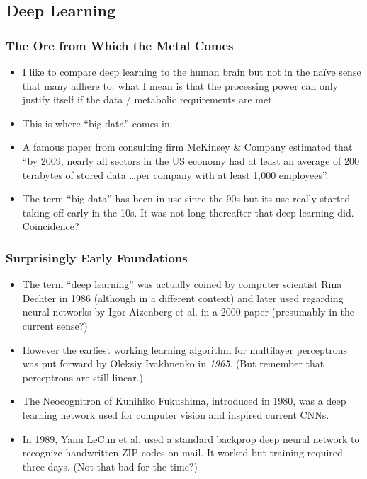\documentclass[10pt]{beamer}
\begin{document}

  \subsection{Deep Learning}

  \begin{frame}
    \frametitle{The Ore from Which the Metal Comes}

    \begin{itemize}
      \item I like to compare deep learning to the human brain but not in the
        naïve sense that many adhere to: what I mean is that the processing
        power can only justify itself if the data / metabolic requirements are
        met.
      \pause
      \item This is where ``big data'' comes in.
      \pause
      \item A famous paper from consulting firm McKinsey \& Company estimated
        that ``by 2009, nearly all sectors in the US economy had at least an
        average of 200 terabytes of stored data \ldots per company with at
        least 1,000 employees''.
      \pause
      \item The term ``big data'' has been in use since the 90s but its use
        really started taking off early in the 10s. It was not long thereafter
        that deep learning did. Coincidence?
    \end{itemize}
  \end{frame}

  \begin{frame}
    \frametitle{Surprisingly Early Foundations}

    \begin{itemize}
      \item The term ``deep learning'' was actually coined by computer
        scientist Rina Dechter in 1986 (although in a different context) and
        later used regarding neural networks by Igor Aizenberg et al. in a
        2000 paper (presumably in the current sense?)
      \pause
      \item However the earliest working learning algorithm for multilayer
        perceptrons was put forward by Oleksiy Ivakhnenko in \emph{1965}. (But
        remember that perceptrons are still linear.)
      \pause
      \item The Neocognitron of Kunihiko Fukushima, introduced in 1980, was a
        deep learning network used for computer vision and inspired current
        CNNs.
      \pause
      \item In 1989, Yann LeCun et al. used a standard backprop deep neural
        network to recognize handwritten ZIP codes on mail. It worked but
        training required three days. (Not that bad for the time?)
    \end{itemize}
  \end{frame}
\end{document}

